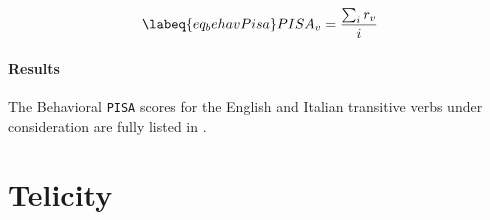 \begin{equation} \labeq{eq_behavPisa}
PISA_{v} = \frac{\sum_{i} r_{v}}{i}
\end{equation}




\paragraph{Results} 
The Behavioral \texttt{PISA} scores for the English and Italian transitive verbs under consideration are fully listed in .\\ 

\section{Telicity} 


